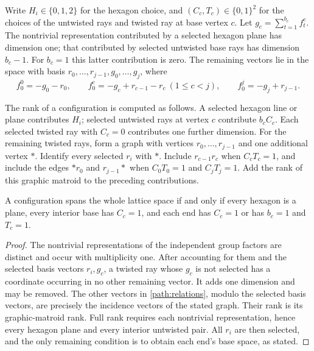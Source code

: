 Write $H_i\in\{0,1,2\}$ for the hexagon choice, and $(C_c,T_c)\in\{0,1\}^2$
for the choices of the untwisted rays and twisted ray at base vertex $c$.
Let $g_c=\sum_{t=1}^{b_c}f_t^c$. The nontrivial representation contributed by
a selected hexagon plane has dimension one; that contributed by selected
untwisted base rays has dimension $b_c-1$. For $b_c=1$ this latter
contribution is zero. The remaining vectors lie in the space with basis
$r_0,\ldots,r_{j-1},g_0,\ldots,g_j$, where
\begin{equation}\label{path:relations}
 f_0^0=-g_0-r_0,\qquad
 f_0^c=-g_c+r_{c-1}-r_c\ (1\le c<j),\qquad
 f_0^j=-g_j+r_{j-1}.
\end{equation}

\begin{lemma}\label{path:rank}
The rank of a configuration is computed as follows. A selected hexagon line
or plane contributes $H_i$; selected untwisted rays at vertex $c$ contribute
$b_c C_c$. Each selected twisted ray with $C_c=0$ contributes one further
dimension. For the remaining twisted rays, form a graph with vertices
$r_0,\ldots,r_{j-1}$ and one additional vertex $*$. Identify every selected
$r_i$ with $*$. Include $r_{c-1}r_c$ when $C_cT_c=1$, and include the edges
$*r_0$ and $r_{j-1}*$ when $C_0T_0=1$ and $C_jT_j=1$. Add the rank of this
graphic matroid to the preceding contributions.

A configuration spans the whole lattice space if and only if every hexagon
is a plane, every interior base has $C_c=1$, and each end has $C_c=1$ or
has $b_c=1$ and $T_c=1$.
\end{lemma}

\begin{proof}
The nontrivial representations of the independent group factors are distinct
and occur with multiplicity one. After accounting for them and the selected
basis vectors $r_i,g_c$, a twisted ray whose $g_c$ is not selected has a
coordinate occurring in no other remaining vector. It adds one dimension
and may be removed. The other vectors in \eqref{path:relations}, modulo
the selected basis vectors, are precisely the incidence vectors of the
stated graph. Their rank is its graphic-matroid rank. Full rank requires
each nontrivial representation, hence every hexagon plane and every
interior untwisted pair. All $r_i$ are then selected, and the only remaining
condition is to obtain each end's base space, as stated.
\end{proof}

